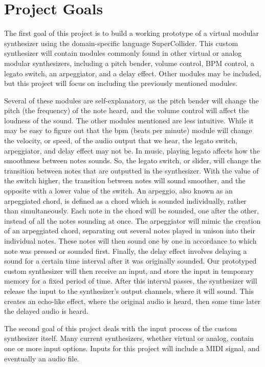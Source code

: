 \section[Project Goals]{Project Goals}\label{project-goals}
The first goal of this project is to build a working prototype of a virtual modular synthesizer using the domain-specific language SuperCollider. This custom synthesizer will contain modules commonly found in other virtual or analog modular synthesizers, including a pitch bender, volume control, BPM control, a legato switch, an arpeggiator, and a delay effect. Other modules may be included, but this project will focus on including the previously mentioned modules. 

Several of these modules are self-explanatory, as the pitch bender will change the pitch (the frequency) of the note heard, and the volume control will affect the loudness of the sound. The other modules mentioned are less intuitive. While it may be easy to figure out that the bpm (beats per minute) module will change the velocity, or speed, of the audio output that we hear, the legato switch, arpeggiator, and delay effect may not be. In music, playing legato affects how the smoothness between notes sounds. So, the legato switch, or slider, will change the transition between notes that are outputted in the synthesizer. With the value of the switch higher, the transition between notes will sound smoother, and the opposite with a lower value of the switch. An arpeggio, also known as an arpeggiated chord, is defined as a chord which is sounded individually, rather than simultaneously. Each note in the chord will be sounded, one after the other, instead of all the notes sounding at once. The arpeggiator will mimic the creation of an arpeggiated chord, separating out several notes played in unison into their individual notes. These notes will then sound one by one in accordance to which note was pressed or sounded first. Finally, the delay effect involves delaying a sound for a certain time interval after it was originally sounded. Our prototyped custom synthesizer will then receive an input, and store the input in temporary memory for a fixed period of time. After this interval passes, the synthesizer will release the input to the synthesizer's output channels, where it will sound. This creates an echo-like effect, where the original audio is heard, then some time later the delayed audio is heard. 

The second goal of this project deals with the input process of the custom synthesizer itself. Many current synthesizers, whether virtual or analog, contain one or more input options. Inputs for this project will include a MIDI signal, and eventually an audio file. 